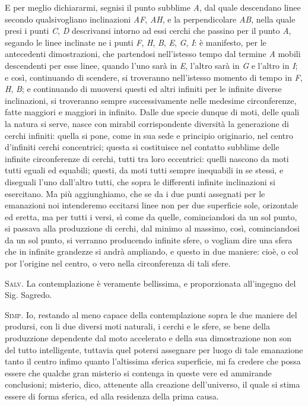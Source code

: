 \documentclass[11pt,twoside,openany]{book}
\newcommand{\speaker}[1]{\textcolor{rubric}{\textsc{#1}}\space}
\begin{document}
E per meglio dichiararmi, segnisi il punto subblime \emph{A}, dal quale descendano linee secondo qualsivogliano inclinazioni \emph{AF}, \emph{AH}, e la perpendicolare \emph{AB}, nella quale presi i punti \emph{C}, \emph{D} descrivansi intorno ad essi cerchi che passino per il punto \emph{A}, segando le linee inclinate ne i punti \emph{F}, \emph{H}, \emph{B}, \emph{E}, \emph{G}, \emph{I}: è manifesto, per le antecedenti dimostrazioni, che partendosi nell'istesso tempo dal termine \emph{A} mobili descendenti per esse linee, quando l'uno sarà in \emph{E}, l'altro sarà in \emph{G} e l'altro in \emph{I}; e così, continuando di scendere, si troveranno nell'istesso momento di tempo in \emph{F}, \emph{H}, \emph{B}; e continuando di muoversi questi ed altri infiniti per le infinite diverse inclinazioni, si troveranno sempre successivamente nelle medesime circonferenze, fatte maggiori e maggiori in infinito. Dalle due specie dunque di moti, delle quali la natura si serve, nasce con mirabil corrispondente diversità la generazione di cerchi infiniti: quella si pone, come in sua sede e principio originario, nel centro d'infiniti cerchi concentrici; questa si costituisce nel contatto subblime delle infinite circonferenze di cerchi, tutti tra loro eccentrici: quelli nascono da moti tutti eguali ed equabili; questi, da moti tutti sempre inequabili in se stessi, e diseguali l'uno dall'altro tutti, che sopra le differenti infinite inclinazioni si esercitano. Ma più aggiunghiamo, che se da i due punti assegnati per le emanazioni noi intenderemo eccitarsi linee non per due superficie sole, orizontale ed eretta, ma per tutti i versi, sì come da quelle, cominciandosi da un sol punto, si passava alla produzzione di cerchi, dal minimo al massimo, così, cominciandosi da un sol punto, si verranno producendo infinite sfere, o vogliam dire una sfera che in infinite grandezze si andrà ampliando, e questo in due maniere: cioè, o col por l'origine nel centro, o vero nella circonferenza di tali sfere.

\speaker{Salv.} La contemplazione è veramente bellissima, e proporzionata all'ingegno del Sig. Sagredo.

\speaker{Simp.} Io, restando al meno capace della contemplazione sopra le due maniere del prodursi, con li due diversi moti naturali, i cerchi e le sfere, se bene della produzzione dependente dal moto accelerato e della sua dimostrazione non son del tutto intelligente, tuttavia quel potersi assegnare per luogo di tale emanazione tanto il centro infimo quanto l'altissima sferica superficie, mi fa credere che possa essere che qualche gran misterio si contenga in queste vere ed ammirande conclusioni; misterio, dico, attenente alla creazione dell'universo, il quale si stima essere di forma sferica, ed alla residenza della prima causa.
\end{document}
